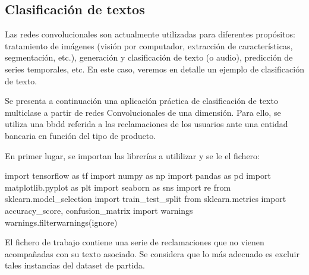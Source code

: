 \documentclass[
  a4paper,
  DIV=11,
  numbers=noendperiod]{scrreprt}
\newenvironment{Shaded}{\begin{snugshade}}{\end{snugshade}}
\newcommand{\ImportTok}[1]{#1}
\newcommand{\NormalTok}[1]{#1}
\newcommand{\StringTok}[1]{\textcolor[rgb]{0.31,0.60,0.02}{#1}}
\begin{document}
\subsection{Clasificación de textos}\label{clasificaciuxf3n-de-textos}

Las redes convolucionales son actualmente utilizadas para diferentes
propósitos: tratamiento de imágenes (visión por computador, extracción
de características, segmentación, etc.), generación y clasificación de
texto (o audio), predicción de series temporales, etc. En este caso,
veremos en detalle un ejemplo de clasificación de texto.

Se presenta a continuación una aplicación práctica de clasificación de
texto multiclase a partir de redes Convolucionales de una dimensión.
Para ello, se utiliza una bbdd referida a las reclamaciones de los
usuarios ante una entidad bancaria en función del tipo de producto.

En primer lugar, se importan las librerías a utililizar y se le el
fichero:

\begin{Shaded}
\begin{Highlighting}[numbers=left,,]
\ImportTok{import}\NormalTok{ tensorflow }\ImportTok{as}\NormalTok{ tf}
\ImportTok{import}\NormalTok{ numpy }\ImportTok{as}\NormalTok{ np}
\ImportTok{import}\NormalTok{ pandas }\ImportTok{as}\NormalTok{ pd}
\ImportTok{import}\NormalTok{ matplotlib.pyplot }\ImportTok{as}\NormalTok{ plt}
\ImportTok{import}\NormalTok{ seaborn }\ImportTok{as}\NormalTok{ sns}
\ImportTok{import}\NormalTok{ re}
\ImportTok{from}\NormalTok{ sklearn.model\_selection }\ImportTok{import}\NormalTok{ train\_test\_split}
\ImportTok{from}\NormalTok{ sklearn.metrics }\ImportTok{import}\NormalTok{ accuracy\_score, confusion\_matrix}
\ImportTok{import}\NormalTok{ warnings}
\NormalTok{warnings.filterwarnings(}\StringTok{\textquotesingle{}ignore\textquotesingle{}}\NormalTok{)}
\end{Highlighting}
\end{Shaded}

El fichero de trabajo contiene una serie de reclamaciones que no vienen
acompañadas con su texto asociado. Se considera que lo más adecuado es
excluir tales instancias del dataset de partida.
\end{document}
